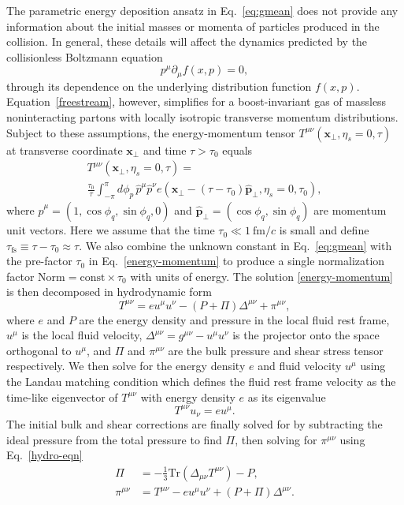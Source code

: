\documentclass[aps,prc,reprint,amsmath,nofootinbib]{revtex4-1}
\newcommand{\fmc}{\ensuremath{\text{fm}/c}}
\newcommand{\taufs}{\tau_\text{fs}}
\newcommand{\xv}{\mathbf x}
\begin{document}
The parametric energy deposition ansatz in Eq.~\eqref{eq:gmean} does not provide any information about the initial masses or momenta of particles produced in the collision.
In general, these details will affect the dynamics predicted by the collisionless Boltzmann equation
\begin{equation}
  \label{freestream}
  p^\mu \partial_\mu f(x, p) = 0,
\end{equation}
through its dependence on the underlying distribution function $f(x, p)$.
Equation~\eqref{freestream}, however, simplifies for a boost-invariant gas of massless noninteracting partons with locally isotropic transverse momentum distributions.
Subject to these assumptions, the energy-momentum tensor $T^{\mu\nu}(\xv_\perp, \eta_s=0, \tau)$ at transverse coordinate $\xv_\perp$ and time $\tau > \tau_0$ equals \cite{Broniowski:2008qk, Liu:2015nwa}
\begin{multline}
  \label{energy-momentum}
  T^{\mu\nu}(\xv_\perp, \eta_s=0, \tau) =\\
  \frac{\tau_0}{\tau} \int_{-\pi}^{\pi} d\phi_p\, \hat{p}^\mu \hat{p}^\nu e(\xv_\perp - (\tau - \tau_0)\hat{\mathbf{p}}_\perp, \eta_s=0, \tau_0),
\end{multline}
where $\hat{p}^\mu = (1, \cos \phi_q, \sin \phi_q, 0)$ and $\hat{\mathbf{p}}_\perp = (\cos \phi_q, \sin \phi_q)$ are momentum unit vectors.
Here we assume that the time $\tau_0 \ll 1~\fmc$ is small and define $\taufs \equiv \tau - \tau_0 \approx \tau$.
We also combine the unknown constant in Eq.~\eqref{eq:gmean} with the pre-factor $\tau_0$ in Eq.~\eqref{energy-momentum} to produce a single normalization factor $\text{Norm} = \text{const} \times \tau_0$ with units of energy.
The solution \eqref{energy-momentum} is then decomposed in hydrodynamic form
\begin{equation}
  \label{hydro-eqn}
  T^{\mu\nu} = e u^\mu u^\nu - (P + \Pi) \Delta^{\mu\nu} + \pi^{\mu\nu},
\end{equation}
where $e$ and $P$ are the energy density and pressure in the local fluid rest frame, $u^\mu$ is the local fluid velocity, ${\Delta^{\mu\nu} = g^{\mu\nu} - u^\mu u^\nu}$ is the projector onto the space orthogonal to $u^\mu$, and $\Pi$ and $\pi^{\mu\nu}$ are the bulk pressure and shear stress tensor respectively.
We then solve for the energy density $e$ and fluid velocity $u^\mu$ using the Landau matching condition which defines the fluid rest frame velocity as the time-like eigenvector of $T^{\mu\nu}$ with energy density $e$ as its eigenvalue
\begin{equation}
  T^{\mu\nu} u_\nu = e u^\mu.
\end{equation}
The initial bulk and shear corrections are finally solved for by subtracting the ideal pressure from the total pressure to find $\Pi$, then solving for $\pi^{\mu\nu}$ using Eq.~\eqref{hydro-eqn}
\begin{align}
  \Pi &= -\frac{1}{3} \mathrm{Tr}(\Delta_{\mu\nu} T^{\mu\nu}) - P,\\
  \pi^{\mu\nu} &= T^{\mu\nu} - e u^\mu u^\nu + (P + \Pi) \Delta^{\mu\nu}.
\end{align}
\end{document}
